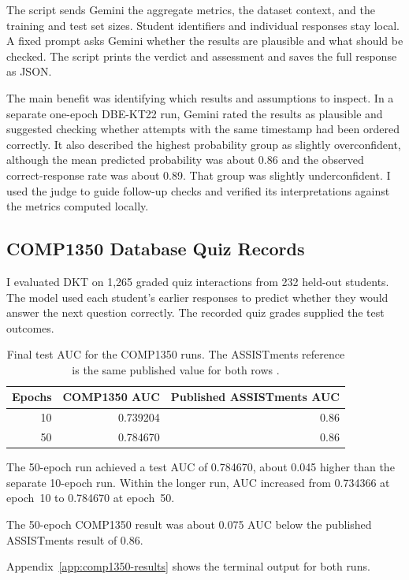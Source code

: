 \documentclass[11pt]{article}
\begin{document}
The script sends Gemini the aggregate metrics, the dataset context,
and the training and test set sizes. Student identifiers and
individual responses stay local. A fixed prompt asks Gemini whether
the results are plausible and what should be checked. The script
prints the verdict and assessment and saves the full response as
JSON.

The main benefit was identifying which results and assumptions to
inspect. In a separate one-epoch DBE-KT22 run, Gemini rated the
results as plausible and suggested checking whether attempts with
the same timestamp had been ordered correctly. It also described
the highest probability group as slightly overconfident, although
the mean predicted probability was about 0.86 and the observed
correct-response rate was about 0.89. That group was slightly
underconfident. I used the judge to guide follow-up checks and
verified its interpretations against the metrics computed locally.

\subsection{COMP1350 Database Quiz Records}

I evaluated DKT on 1,265 graded quiz interactions from 232 held-out
students. The model used each student's earlier responses to predict
whether they would answer the next question correctly. The recorded
quiz grades supplied the test outcomes.

\begin{table}[H]
\centering
\small
\begin{tabular}{@{}rrr@{}}
\hline
Epochs & COMP1350 AUC & Published ASSISTments AUC \\
\hline
10 & 0.739204 & 0.86 \\
50 & 0.784670 & 0.86 \\
\hline
\end{tabular}
\caption{Final test AUC for the COMP1350 runs. The ASSISTments
reference is the same published value for both rows
\citep{piech2015deep}.}
\label{tab:comp1350-results}
\end{table}

The 50-epoch run achieved a test AUC of 0.784670, about 0.045 higher
than the separate 10-epoch run. Within the longer run, AUC increased
from 0.734366 at epoch~10 to 0.784670 at epoch~50.

The 50-epoch COMP1350 result was about 0.075 AUC below the published ASSISTments result of 0.86.

Appendix~\ref{app:comp1350-results} shows the terminal output for
both runs.
\end{document}
